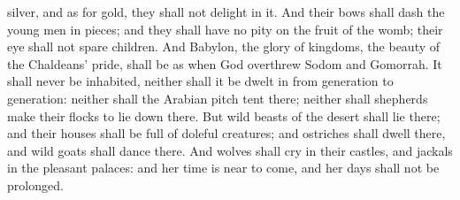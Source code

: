 silver, and as for gold, they shall not delight in it. And their bows shall dash the young men in pieces; and they shall have no pity on the fruit of the womb; their eye shall not spare children. And Babylon, the glory of kingdoms, the beauty of the Chaldeans’ pride, shall be as when God overthrew Sodom and Gomorrah. It shall never be inhabited, neither shall it be dwelt in from generation to generation: neither shall the Arabian pitch tent there; neither shall shepherds make their flocks to lie down there. But wild beasts of the desert shall lie there; and their houses shall be full of doleful creatures; and ostriches shall dwell there, and wild goats shall dance there. And wolves shall cry in their castles, and jackals in the pleasant palaces: and her time is near to come, and her days shall not be prolonged. 

